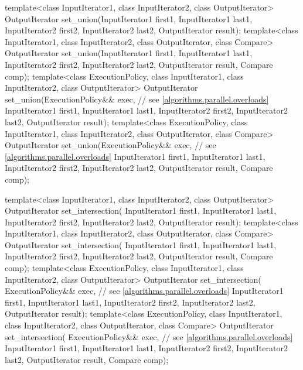 \begin{codeblock}
{  template<class InputIterator1, class InputIterator2, class OutputIterator>
    OutputIterator set_union(InputIterator1 first1, InputIterator1 last1,
                             InputIterator2 first2, InputIterator2 last2,
                             OutputIterator result);
  template<class InputIterator1, class InputIterator2, class OutputIterator, class Compare>
    OutputIterator set_union(InputIterator1 first1, InputIterator1 last1,
                             InputIterator2 first2, InputIterator2 last2,
                             OutputIterator result, Compare comp);
  template<class ExecutionPolicy, class InputIterator1, class InputIterator2,
           class OutputIterator>
    OutputIterator set_union(ExecutionPolicy&& exec, // see \ref{algorithms.parallel.overloads}
                             InputIterator1 first1, InputIterator1 last1,
                             InputIterator2 first2, InputIterator2 last2,
                             OutputIterator result);
  template<class ExecutionPolicy, class InputIterator1, class InputIterator2,
           class OutputIterator, class Compare>
    OutputIterator set_union(ExecutionPolicy&& exec, // see \ref{algorithms.parallel.overloads}
                             InputIterator1 first1, InputIterator1 last1,
                             InputIterator2 first2, InputIterator2 last2,
                             OutputIterator result, Compare comp);

  template<class InputIterator1, class InputIterator2, class OutputIterator>
    OutputIterator set_intersection(
      InputIterator1 first1, InputIterator1 last1,
      InputIterator2 first2, InputIterator2 last2,
      OutputIterator result);
  template<class InputIterator1, class InputIterator2, class OutputIterator, class Compare>
    OutputIterator set_intersection(
      InputIterator1 first1, InputIterator1 last1,
      InputIterator2 first2, InputIterator2 last2,
      OutputIterator result, Compare comp);
  template<class ExecutionPolicy, class InputIterator1, class InputIterator2,
           class OutputIterator>
    OutputIterator set_intersection(
      ExecutionPolicy&& exec, // see \ref{algorithms.parallel.overloads}
      InputIterator1 first1, InputIterator1 last1,
      InputIterator2 first2, InputIterator2 last2,
      OutputIterator result);
  template<class ExecutionPolicy, class InputIterator1, class InputIterator2,
           class OutputIterator, class Compare>
    OutputIterator set_intersection(
      ExecutionPolicy&& exec, // see \ref{algorithms.parallel.overloads}
      InputIterator1 first1, InputIterator1 last1,
      InputIterator2 first2, InputIterator2 last2,
      OutputIterator result, Compare comp);

}
\end{codeblock}
